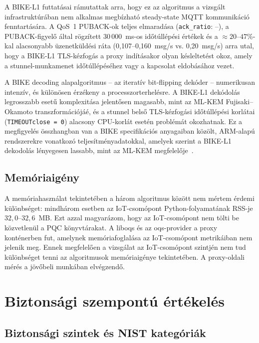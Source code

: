 A BIKE-L1 futtatásai rámutattak arra, hogy ez az algoritmus a vizsgált infrastruktúrában
nem alkalmas megbízható steady-state MQTT kommunikáció fenntartására. A QoS~1 PUBACK-ok
teljes elmaradása (\texttt{ack\_ratio}: --), a PUBACK-figyelő által rögzített 30\,000~ms-os
időtúllépési értékek és a $\approx 20$--$47$\%-kal alacsonyabb üzenetküldési ráta
(0,107--0,160~msg/s vs. 0,20~msg/s) arra utal, hogy a BIKE-L1 TLS-kézfogás a proxy
indításakor olyan késleltetést okoz, amely a stunnel-munkamenet időtúllépéséhez vagy a
kapcsolat eldobásához vezet.

A BIKE decoding alapalgoritmus -- az iteratív bit-flipping dekóder -- numerikusan
intenzív, és különösen érzékeny a processzorterhelésre. A BIKE-L1 dekódolás legrosszabb
esetű komplexitása jelentősen magasabb, mint az ML-KEM Fujisaki--Okamoto transzformációjáé,
és a stunnel belső TLS-kézfogási időtúllépési korlátai (\texttt{TIMEOUTclose = 0})
alacsony CPU-korlát esetén problémát okozhatnak. Ez a megfigyelés összhangban van a
BIKE specifikációs anyagaiban közölt, ARM-alapú rendszerekre vonatkozó teljesítményadatokkal,
amelyek szerint a BIKE-L1 dekodolás lényegesen lassabb, mint az ML-KEM megfelelője~\cite{BIKE-SPEC}.

\FloatBarrier
\subsection{Memóriaigény}

A memóriahasználat tekintetében a három algoritmus között nem mértem érdemi különbséget:
mindhárom esetben az IoT-csomópont Python-folyamatának RSS-je $32{,}0$--$32{,}6$~MB.
Ezt azzal magyarázom, hogy az IoT-csomópont nem tölti be közvetlenül a PQC könyvtárakat.
A liboqs és az oqs-provider a proxy konténerben fut, amelynek memóriafoglalása az
IoT-csomópont metrikáiban nem jelenik meg. Ennek megfelelően a vizsgálat az IoT-csomópont
szintjén nem tud különbséget tenni az algoritmusok memóriaigénye tekintetében. A
proxy-oldali mérés a jövőbeli munkában elvégzendő.

\section{Biztonsági szempontú értékelés}

\subsection{Biztonsági szintek és NIST kategóriák}

